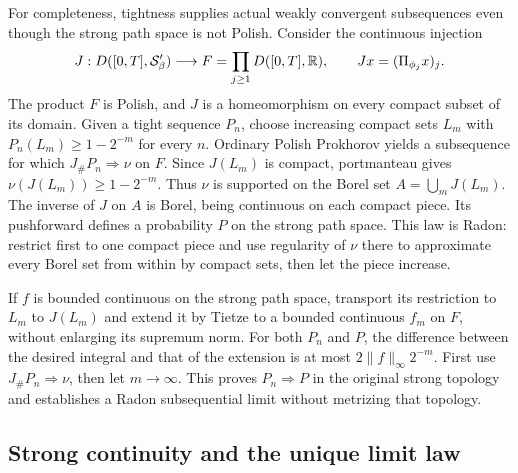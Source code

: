 For completeness, tightness supplies actual weakly convergent
subsequences even though the strong path space is not Polish.
Consider the continuous injection
\[
 J:D([0,T],\mathcal S'_\beta)\longrightarrow
 F=\prod_{j\geq1}D([0,T],\mathbb R),\qquad
 Jx=(\Pi_{\phi_j}x)_j.
\]
The product $F$ is Polish, and $J$ is a homeomorphism on every compact
subset of its domain. Given a tight sequence $P_n$, choose increasing
compact sets $L_m$ with $P_n(L_m)\geq1-2^{-m}$ for every $n$.
Ordinary Polish Prokhorov yields a subsequence for which
$J_\#P_n\Rightarrow\nu$ on $F$.
Since $J(L_m)$ is compact, portmanteau gives
$\nu(J(L_m))\geq1-2^{-m}$.
Thus $\nu$ is supported on the Borel set
$A=\bigcup_mJ(L_m)$.
The inverse of $J$ on $A$ is Borel, being continuous on each compact
piece. Its pushforward defines a probability $P$ on the strong path
space. This law is Radon: restrict first to one compact piece and use
regularity of $\nu$ there to approximate every Borel set from within
by compact sets, then let the piece increase.

If $f$ is bounded continuous on the strong path space, transport its
restriction to $L_m$ to $J(L_m)$ and extend it by Tietze to a bounded
continuous $f_m$ on $F$, without enlarging its supremum norm.
For both $P_n$ and $P$, the difference between the desired integral
and that of the extension is at most $2\|f\|_\infty2^{-m}$.
First use $J_\#P_n\Rightarrow\nu$, then let $m\to\infty$.
This proves $P_n\Rightarrow P$ in the original strong topology and
establishes a Radon subsequential limit without metrizing that topology.

\subsection{Strong continuity and the unique limit law}

